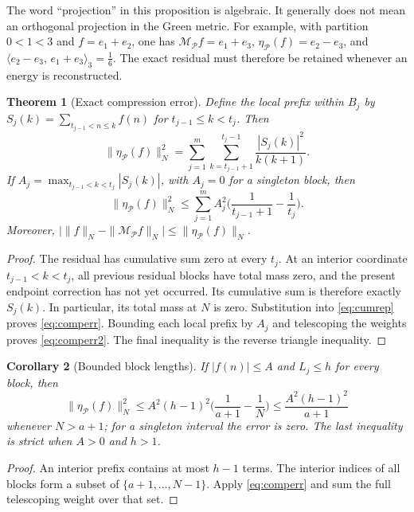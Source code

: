 \documentclass[11pt]{article}
\newtheorem{theorem}{Theorem}[section]
\newtheorem{corollary}[theorem]{Corollary}
\theoremstyle{definition}
\theoremstyle{remark}
\newcommand{\ip}[2]{\langle #1,\, #2\rangle}
\begin{document}
The word ``projection'' in this proposition is algebraic. It generally does not mean an orthogonal projection in the Green metric. For example, with partition $0<1<3$ and $f=e_1+e_2$, one has $\mathcal M_{\mathcal P}f=e_1+e_3$, $\eta_{\mathcal P}(f)=e_2-e_3$, and $\ip{e_2-e_3}{e_1+e_3}_3=\frac16$. The exact residual must therefore be retained whenever an energy is reconstructed.

\begin{theorem}[Exact compression error]\label{thm:compression}
Define the local prefix within $B_j$ by $S_j(k)=\sum_{t_{j-1}<n\le k}f(n)$ for $t_{j-1}\le k<t_j$. Then
\begin{equation}\label{eq:comperr}
\|\eta_{\mathcal P}(f)\|_N^2=\sum_{j=1}^m\sum_{k=t_{j-1}+1}^{t_j-1}\frac{|S_j(k)|^2}{k(k+1)}.
\end{equation}
If $A_j=\max_{t_{j-1}<k<t_j}|S_j(k)|$, with $A_j=0$ for a singleton block, then
\begin{equation}\label{eq:comperr2}
\|\eta_{\mathcal P}(f)\|_N^2\le\sum_{j=1}^m A_j^2\Big(\frac{1}{t_{j-1}+1}-\frac1{t_j}\Big).
\end{equation}
Moreover, $\big|\|f\|_N-\|\mathcal M_{\mathcal P}f\|_N\big|\le\|\eta_{\mathcal P}(f)\|_N$.
\end{theorem}

\begin{proof}
The residual has cumulative sum zero at every $t_j$. At an interior coordinate $t_{j-1}<k<t_j$, all previous residual blocks have total mass zero, and the present endpoint correction has not yet occurred. Its cumulative sum is therefore exactly $S_j(k)$. In particular, its total mass at $N$ is zero. Substitution into \eqref{eq:cumrep} proves \eqref{eq:comperr}. Bounding each local prefix by $A_j$ and telescoping the weights proves \eqref{eq:comperr2}. The final inequality is the reverse triangle inequality.
\end{proof}

\begin{corollary}[Bounded block lengths]
If $|f(n)|\le A$ and $L_j\le h$ for every block, then
\begin{equation}
\|\eta_{\mathcal P}(f)\|_N^2\le A^2(h-1)^2\Big(\frac1{a+1}-\frac1N\Big)\le\frac{A^2(h-1)^2}{a+1}
\end{equation}
whenever $N>a+1$; for a singleton interval the error is zero. The last inequality is strict when $A>0$ and $h>1$.
\end{corollary}

\begin{proof}
An interior prefix contains at most $h-1$ terms. The interior indices of all blocks form a subset of $\{a+1,\dots,N-1\}$. Apply \eqref{eq:comperr} and sum the full telescoping weight over that set.
\end{proof}
\end{document}
